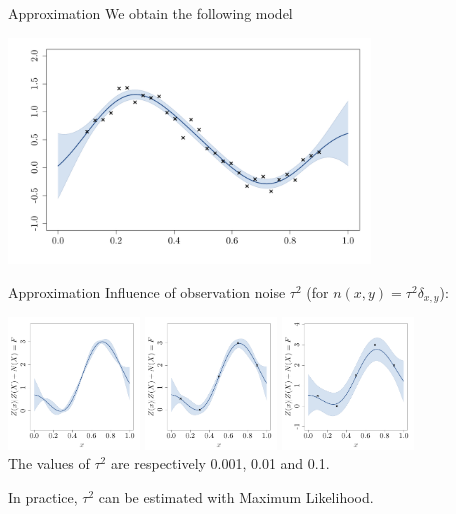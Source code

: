 \documentclass{beamer}
\begin{document}
\begin{frame}{Approximation}
We obtain the following model
\begin{center}
\includegraphics[height=6cm]{figures/R/noisyGPR} 
\end{center}
\end{frame}

\begin{frame}{Approximation}
Influence of observation noise $\tau^2$ (for $n(x,y)=\tau^2 \delta_{x,y}$):
\begin{center}
\includegraphics[height=3.5cm]{figures/R/ch34_GPRnoise0001} 
\includegraphics[height=3.5cm]{figures/R/ch34_GPRnoise001} 
\includegraphics[height=3.5cm]{figures/R/ch34_GPRnoise01}\\
The values of $\tau^2$ are respectively 0.001, 0.01 and 0.1.
\end{center}
In practice, $\tau^2$ can be estimated with Maximum Likelihood. 
\end{frame}


\end{document}
